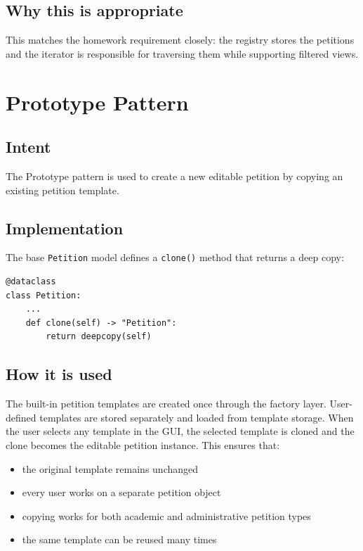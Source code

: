 \documentclass[11pt,a4paper]{article}
\begin{document}
\subsection{Why this is appropriate}

This matches the homework requirement closely: the registry stores the petitions
and the iterator is responsible for traversing them while supporting filtered
views.

\section{Prototype Pattern}

\subsection{Intent}

The Prototype pattern is used to create a new editable petition by copying an
existing petition template.

\subsection{Implementation}

The base \texttt{Petition} model defines a \texttt{clone()} method that returns
a deep copy:

\begin{lstlisting}[style=pythonstyle,caption={Prototype cloning support}]
@dataclass
class Petition:
    ...
    def clone(self) -> "Petition":
        return deepcopy(self)
\end{lstlisting}

\subsection{How it is used}

The built-in petition templates are created once through the factory layer.
User-defined templates are stored separately and loaded from template storage.
When the user selects any template in the GUI, the selected template is cloned
and the clone becomes the editable petition instance. This ensures that:
\begin{itemize}[leftmargin=1.5em]
    \item the original template remains unchanged
    \item every user works on a separate petition object
    \item copying works for both academic and administrative petition types
    \item the same template can be reused many times
\end{itemize}
\end{document}
